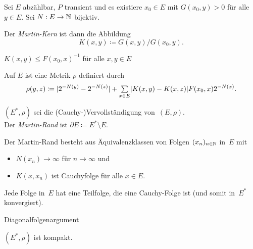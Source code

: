 \documentclass{cheat-sheet}
\begin{document}
\begin{situation}
  Sei $E$ abzählbar, $P$ transient und es existiere $x_0 \in E$ mit $G(x_0, y) > 0$ für alle $y \in E$.
  Sei $N : E \to \mathbb{N}$ bijektiv.
\end{situation}

\begin{defn}
  Der \emph{Martin-Kern} ist dann die Abbildung
  \[
    K(x, y) \coloneqq G(x, y) / G(x_0, y).
  \]
\end{defn}

\begin{lem}
  $K(x, y) \leq F(x_0, x)^{-1}$ für alle $x, y \in E$
\end{lem}

\begin{defn}
  Auf $E$ ist eine Metrik $\rho$ definiert durch
  \[
    \rho(y, z) \coloneqq \abs{2^{-N(y)} - 2^{-N(z)}} + \sum_{x \in E} \abs{K(x, y) - K(x, z)} F(x_0, x) 2^{-N(x)}.
  \]
\end{defn}

\begin{defn}
  \begin{minipage}[t]{0.85 \linewidth}
    $(E^*, \rho)$ sei die (Cauchy-)Vervollständigung von~$(E, \rho)$. \\
    Der \emph{Martin-Rand} ist $\partial E \coloneqq E^* \setminus E$.
  \end{minipage}
\end{defn}

\begin{bem}
  Der Martin-Rand besteht aus Äquivalenzklassen von Folgen $(x_n)_{n \in \mathbb{N}}$ in~$E$ mit
  \begin{itemize}
    \item $N(x_n) \to \infty$ für $n \to \infty$ und
    \item $K(x, x_n)$ ist Cauchyfolge für alle $x \in E$.
  \end{itemize}
\end{bem}

\begin{lem}
  Jede Folge in~$E$ hat eine Teilfolge, die eine Cauchy-Folge ist (und somit in~$E^*$ konvergiert).
\end{lem}

\begin{beweisidee}
  Diagonalfolgenargument
\end{beweisidee}

\begin{kor}
  $(E^*, \rho)$ ist kompakt.
\end{kor}
\end{document}
